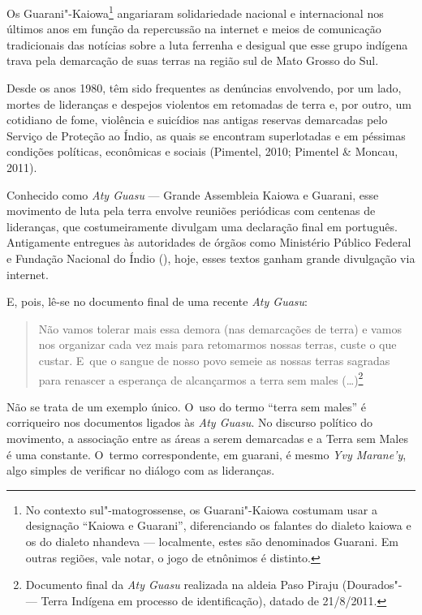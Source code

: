 \noindent
Os Guarani"-Kaiowa\footnote{No contexto sul"-matogrossense, os
Guarani"-Kaiowa costumam usar a designação ``Kaiowa e Guarani'',
diferenciando os falantes do dialeto kaiowa e os do dialeto nhandeva ---
localmente, estes são denominados Guarani. Em outras regiões, vale
notar, o jogo de etnônimos é distinto.} angariaram solidariedade
nacional e internacional nos últimos anos em função da repercussão na
internet e meios de comunicação tradicionais das notícias sobre a luta
ferrenha e desigual que esse grupo indígena trava pela demarcação de
suas terras na região sul de Mato Grosso do Sul.

Desde os anos 1980, têm sido frequentes as denúncias envolvendo, por um
lado, mortes de lideranças e despejos violentos em retomadas de terra
e, por outro, um cotidiano de fome, violência e suicídios nas antigas
reservas demarcadas pelo Serviço de Proteção ao Índio, as quais se
encontram superlotadas e em péssimas condições políticas, econômicas e
sociais (Pimentel, 2010; Pimentel \& Moncau, 2011).

Conhecido como \emph{Aty Guasu} --- Grande Assembleia Kaiowa e Guarani, esse
movimento de luta pela terra envolve reuniões periódicas com centenas
de lideranças, que costumeiramente divulgam uma declaração final em
português. Antigamente entregues às autoridades de órgãos como
Ministério Público Federal e Fundação Nacional do Índio (), hoje,
esses textos ganham grande divulgação via internet.

E, pois, lê-se no documento final de uma recente \emph{Aty Guasu}:

\begin{quote}
\noindent
Não vamos tolerar mais essa demora (nas demarcações de terra) e vamos
nos organizar cada vez mais para retomarmos nossas terras, custe o que
custar. E~que o sangue de nosso povo semeie as nossas terras sagradas
para renascer a esperança de alcançarmos a terra sem males
(\ldots{})\footnote{Documento final da \emph{Aty Guasu} realizada na aldeia Paso
Piraju (Dourados"- --- Terra Indígena em processo de identificação),
datado de 21/8/2011.}
\end{quote}

Não se trata de um exemplo único. O~uso do termo ``terra sem males'' é
corriqueiro nos documentos ligados às \emph{Aty Guasu}. No discurso político
do movimento, a associação entre as áreas a serem demarcadas e a Terra
sem Males é uma constante. O~termo correspondente, em guarani, é mesmo
\emph{Yvy Marane’y}, algo simples de verificar no diálogo com as lideranças.

